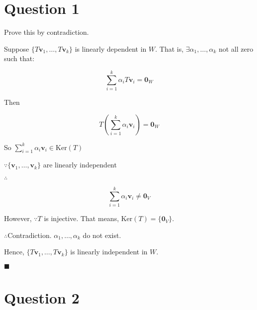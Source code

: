 \documentclass[12pt]{article}
\renewcommand{\qed}{\hfill$\blacksquare$}
\renewenvironment{proof}{\begin{addmargin}[1em]{0em}\begin{newproof}}{\end{newproof}\end{addmargin}\qed}
\begin{document}
    

\rhead{\today}

\section{Question 1}

\begin{proof}{}
    \noindent

    Prove this by contradiction.

    Suppose $\{T\mathbf{v}_1,\dots,T\mathbf{v}_k\}$ is linearly dependent in $W$. That is, $\exists \alpha_1,\dots,\alpha_k$ not all zero such that:

    \[
        \sum_{i=1}^{k}\alpha_iT\mathbf{v}_i=\mathbf{0}_W
    \]

    Then

    \[
        T\left(\sum_{i=1}^{k}\alpha_i\mathbf{v}_i\right)=\mathbf{0}_W
    \]

    So $\sum_{i=1}^{k}\alpha_i\mathbf{v}_i\in \textrm{Ker}(T)$

    $\because \{\mathbf{v}_1,\dots,\mathbf{v}_k\}$ are linearly independent

    $\therefore$

    \[
        \sum_{i=1}^{k}\alpha_i\mathbf{v}_i\not=\mathbf{0}_V
    \]

    However, $\because T$ is injective. That means, $\textrm{Ker}(T)=\{\mathbf{0}_V\}$.
    
    $\therefore$Contradiction. $\alpha_1,\dots,\alpha_k$ do not exist.

    Hence, $\{T\mathbf{v}_1,\dots,T\mathbf{v}_k\}$ is linearly independent in $W$.
\end{proof}

\pagebreak

\section{Question 2}
\end{document}
